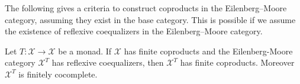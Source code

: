 The following gives a criteria to construct coproducts in the Eilenberg–Moore category, assuming they exist in the base category. This is possible if we assume the existence of reflexive coequalizers in the Eilenberg–Moore category.

\begin{mainbox}{}
    \begin{prop}\label{algebras category has colim if the base category has coprod}
        Let $T:\mathcal{\mathcal{X}} \to \mathcal{X}$ be a monad. If $\mathcal{X}$ has finite coproducts and the Eilenberg-Moore category $\mathcal{X}^T$ has reflexive coequalizers, then $\mathcal{X}^T$ has finite coproducts. Moreover $\mathcal{X}^T$ is finitely cocomplete.
    \end{prop}
\end{mainbox}

